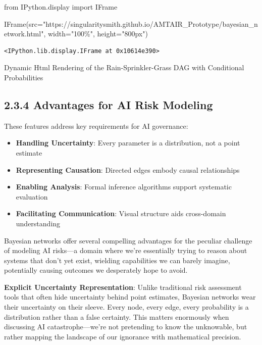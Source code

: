 \documentclass[
  11pt,
  letterpaper,
  openany]{book}
\newenvironment{Shaded}{\begin{snugshade}}{\end{snugshade}}
\newcommand{\ImportTok}[1]{\textcolor[rgb]{0.00,0.46,0.62}{#1}}
\newcommand{\NormalTok}[1]{\textcolor[rgb]{0.00,0.23,0.31}{#1}}
\newcommand{\OperatorTok}[1]{\textcolor[rgb]{0.37,0.37,0.37}{#1}}
\newcommand{\StringTok}[1]{\textcolor[rgb]{0.13,0.47,0.30}{#1}}
\providecommand{\tightlist}{%
  \setlength{\itemsep}{0pt}\setlength{\parskip}{0pt}}
\begin{document}
\begin{Shaded}
\begin{Highlighting}[]
\ImportTok{from}\NormalTok{ IPython.display }\ImportTok{import}\NormalTok{ IFrame}

\NormalTok{IFrame(src}\OperatorTok{=}\StringTok{"https://singularitysmith.github.io/AMTAIR\_Prototype/bayesian\_network.html"}\NormalTok{, width}\OperatorTok{=}\StringTok{"100\%"}\NormalTok{, height}\OperatorTok{=}\StringTok{"800px"}\NormalTok{)}
\end{Highlighting}
\end{Shaded}

\label{rain_sprinkler_grass_example_network_rendering}
\begin{verbatim}
<IPython.lib.display.IFrame at 0x10614e390>
\end{verbatim}

Dynamic Html Rendering of the Rain-Sprinkler-Grass DAG with Conditional
Probabilities

\subsection{2.3.4 Advantages for AI Risk
Modeling}\label{sec-modeling-advantages}

These features address key requirements for AI governance:

\begin{itemize}
\tightlist
\item
  \textbf{Handling Uncertainty}: Every parameter is a distribution, not
  a point estimate
\item
  \textbf{Representing Causation}: Directed edges embody causal
  relationships
\item
  \textbf{Enabling Analysis}: Formal inference algorithms support
  systematic evaluation
\item
  \textbf{Facilitating Communication}: Visual structure aids
  cross-domain understanding
\end{itemize}

Bayesian networks offer several compelling advantages for the peculiar
challenge of modeling AI risks---a domain where we're essentially trying
to reason about systems that don't yet exist, wielding capabilities we
can barely imagine, potentially causing outcomes we desperately hope to
avoid.

\textbf{Explicit Uncertainty Representation}: Unlike traditional risk
assessment tools that often hide uncertainty behind point estimates,
Bayesian networks wear their uncertainty on their sleeve. Every node,
every edge, every probability is a distribution rather than a false
certainty. This matters enormously when discussing AI
catastrophe---we're not pretending to know the unknowable, but rather
mapping the landscape of our ignorance with mathematical precision.
\end{document}

